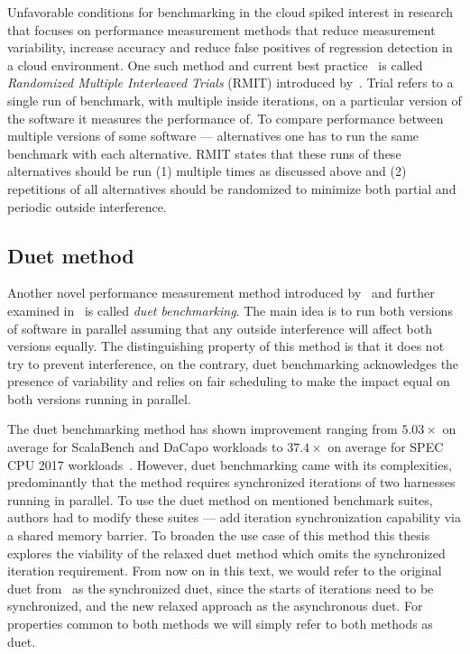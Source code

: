 Unfavorable conditions for benchmarking in the cloud spiked interest in research that focuses on performance measurement methods that reduce measurement variability, increase accuracy and reduce false positives of regression detection in a cloud environment.
One such method and current best practice~\cite{laaber2019software} is called \emph{Randomized Multiple Interleaved Trials} (RMIT) introduced by~\citet{abedi2017conducting}.
Trial refers to a single run of benchmark, with multiple inside iterations, on a particular version of the software it measures the performance of.
To compare performance between multiple versions of some software --- alternatives one has to run the same benchmark with each alternative.
RMIT states that these runs of these alternatives should be run (1) multiple times as discussed above and (2) repetitions of all alternatives should be randomized to minimize both partial and periodic outside interference.

\subsection{Duet method}
Another novel performance measurement method introduced by~\citet{bulej2019initial} and further examined in~\citet{bulej2020duet} is called \emph{duet benchmarking}.
The main idea is to run both versions of software in parallel assuming that any outside interference will affect both versions equally.
The distinguishing property of this method is that it does not try to prevent interference, on the contrary, duet benchmarking acknowledges the presence of variability and relies on fair scheduling to make the impact equal on both versions running in parallel.

The duet benchmarking method has shown improvement ranging from $5.03 \times$ on average for ScalaBench and DaCapo workloads to $37.4 \times$ on average for SPEC CPU 2017 workloads~\cite{bulej2022duet}.
However, duet benchmarking came with its complexities, predominantly that the method requires synchronized iterations of two harnesses running in parallel.
To use the duet method on mentioned benchmark suites, authors had to modify these suites --- add iteration synchronization capability via a shared memory barrier.
To broaden the use case of this method this thesis explores the viability of the relaxed duet method which omits the synchronized iteration requirement.
From now on in this text, we would refer to the original duet from~\citet{bulej2020duet} as the synchronized duet, since the starts of iterations need to be synchronized, and the new relaxed approach as the asynchronous duet.
For properties common to both methods we will simply refer to both methods as duet.
